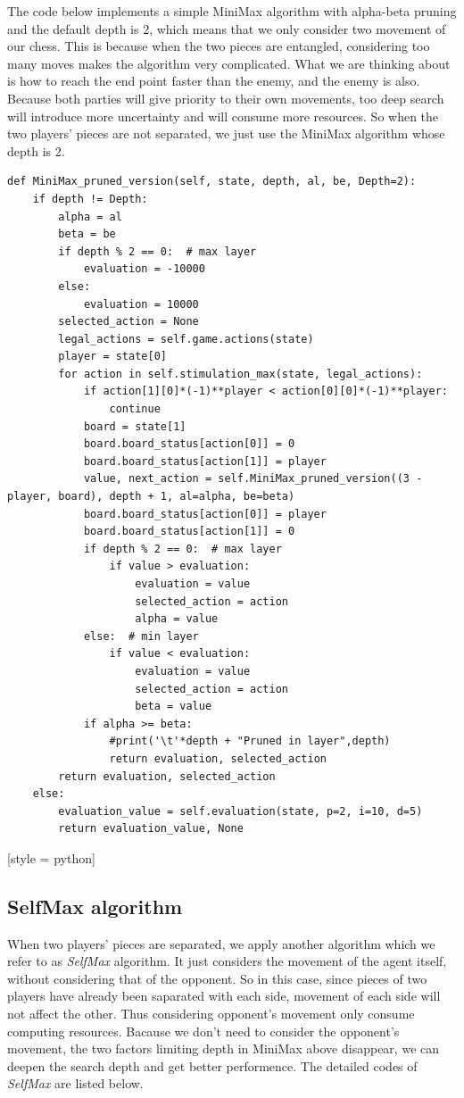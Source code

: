 \documentclass[aps,letterpaper,10pt]{article}
\begin{document}
The code below implements a simple MiniMax algorithm with alpha-beta pruning and the default depth is 2, which means that we only consider two movement of our chess.
This is because when the two pieces are entangled, considering too many moves makes the algorithm very complicated. 
What we are thinking about is how to reach the end point faster than the enemy, and the enemy is also.
Because both parties will give priority to their own movements, too deep search will introduce more uncertainty and will consume more resources.
So when the two players’ pieces are not separated, we just use the MiniMax algorithm whose depth is 2.

\begin{lstlisting}[style = python]
def MiniMax_pruned_version(self, state, depth, al, be, Depth=2):
	if depth != Depth:
		alpha = al
		beta = be
		if depth % 2 == 0:  # max layer
			evaluation = -10000
		else:
			evaluation = 10000
		selected_action = None
		legal_actions = self.game.actions(state)
		player = state[0]
		for action in self.stimulation_max(state, legal_actions):
			if action[1][0]*(-1)**player < action[0][0]*(-1)**player:
				continue
			board = state[1]
			board.board_status[action[0]] = 0
			board.board_status[action[1]] = player
			value, next_action = self.MiniMax_pruned_version((3 - player, board), depth + 1, al=alpha, be=beta)
			board.board_status[action[0]] = player
			board.board_status[action[1]] = 0
			if depth % 2 == 0:  # max layer
				if value > evaluation:
					evaluation = value
					selected_action = action
					alpha = value
			else:  # min layer
				if value < evaluation:
					evaluation = value
					selected_action = action
					beta = value
			if alpha >= beta:
				#print('\t'*depth + "Pruned in layer",depth)
				return evaluation, selected_action
		return evaluation, selected_action
	else:
		evaluation_value = self.evaluation(state, p=2, i=10, d=5)
		return evaluation_value, None
\end{lstlisting}[style = python]




\subsection{SelfMax algorithm}
When two players’ pieces are separated, we apply another algorithm which we refer to as {\itshape SelfMax} algorithm.
It just considers the movement of the agent itself, without considering that of the opponent.
So in this case, since pieces of two players have already been saparated with each side, movement of each side will not affect the other. Thus considering opponent's movement only consume computing resources.
Bacause we don't need to consider the opponent's movement, the two factors limiting depth in MiniMax above disappear, we can deepen the search depth and get better performence. The detailed codes of {\itshape SelfMax} are listed below.
\end{document}
